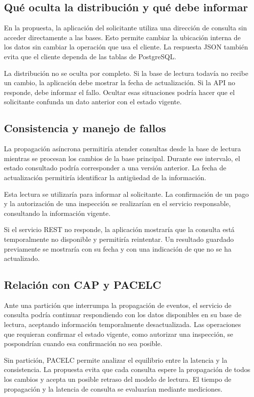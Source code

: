 \subsection{Qué oculta la distribución y qué debe informar}
En la propuesta, la aplicación del solicitante utiliza una dirección de consulta sin acceder directamente a las bases. Esto permite cambiar la ubicación interna de los datos sin cambiar la operación que usa el cliente. La respuesta JSON también evita que el cliente dependa de las tablas de PostgreSQL.

La distribución no se oculta por completo. Si la base de lectura todavía no recibe un cambio, la aplicación debe mostrar la fecha de actualización. Si la API no responde, debe informar el fallo. Ocultar esas situaciones podría hacer que el solicitante confunda un dato anterior con el estado vigente.

\subsection{Consistencia y manejo de fallos}
La propagación asíncrona permitiría atender consultas desde la base de lectura mientras se procesan los cambios de la base principal. Durante ese intervalo, el estado consultado podría corresponder a una versión anterior. La fecha de actualización permitiría identificar la antigüedad de la información.

Esta lectura se utilizaría para informar al solicitante. La confirmación de un pago y la autorización de una inspección se realizarían en el servicio responsable, consultando la información vigente.

Si el servicio REST no responde, la aplicación mostraría que la consulta está temporalmente no disponible y permitiría reintentar. Un resultado guardado previamente se mostraría con su fecha y con una indicación de que no se ha actualizado.

\subsection{Relación con CAP y PACELC}
Ante una partición que interrumpa la propagación de eventos, el servicio de consulta podría continuar respondiendo con los datos disponibles en su base de lectura, aceptando información temporalmente desactualizada. Las operaciones que requieran confirmar el estado vigente, como autorizar una inspección, se pospondrían cuando esa confirmación no sea posible.

Sin partición, PACELC permite analizar el equilibrio entre la latencia y la consistencia. La propuesta evita que cada consulta espere la propagación de todos los cambios y acepta un posible retraso del modelo de lectura. El tiempo de propagación y la latencia de consulta se evaluarían mediante mediciones.

